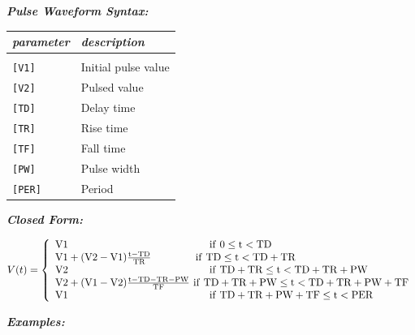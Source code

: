 \textbf{\textit{Pulse Waveform Syntax:}}


\begin{longtable}{l l}
\textit{parameter} & \textit{description} \\ \hline \\ \vspace{-0.8\parskip}
\texttt{[V1]} & Initial pulse value \\
\texttt{[V2]} & Pulsed value \\
\texttt{[TD]} & Delay time \\
\texttt{[TR]} & Rise time \\
\texttt{[TF]} & Fall time \\
\texttt{[PW]} & Pulse width \\
\texttt{[PER]} & Period
\end{longtable}

\textbf{\textit{Closed Form:}}

  \[
    V(t)=\left\{
                \begin{array}{l l}
                  \rm{V1} \hspace{1.9in} \rm{if\ }0\leq t<\rm{TD}\\
                  \rm{V1}+(\rm{V2}-\rm{V1})\frac{t-\rm{TD}}{\rm{TR}}\hspace{0.55in}\rm{\ if\ TD}\leq t<\rm{TD}+\rm{TR}\\
									\rm{V2} \hspace{1.9in} \rm{if\ TD}+\rm{TR}\leq t<\rm{TD}+\rm{TR}+\rm{PW}\\
                  \rm{V2}+(\rm{V1}-\rm{V2})\frac{t-\rm{TD}-\rm{TR}-\rm{PW}}{\rm{TF}}\rm{\ if\ }\rm{TD}+\rm{TR}+\rm{PW}\leq t<\rm{TD}+\rm{TR}+\rm{PW}+\rm{TF}\\
									\rm{V1} \hspace{1.9in} \rm{if\ }\rm{TD}+\rm{TR}+\rm{PW}+\rm{TF}\leq t<\rm{PER}
                \end{array}
              \right.
  \]

\textbf{\textit{Examples:}}

